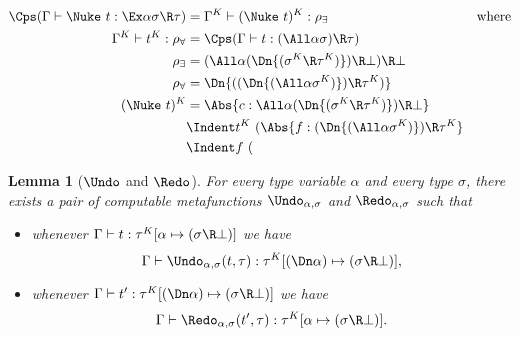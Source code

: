 \documentclass{amsart}
\newtheorem{lemma}[subsection]{Lemma}
\begin{document}
\begin{align*}
\Cps(\Gamma \vdash \Nuke~t : \Ex\alpha \sigma \R \tau)
  & =
  \Gamma^K \vdash (\Nuke~t)^K : \rho_\exists
  &\mbox{where}
  \\
\Gamma^K \vdash t^K : \rho_\forall
   & =
  \Cps(\Gamma \vdash t : (\All\alpha\sigma) \R \tau)
  \\
\rho_\exists & =
  (\All\alpha (\Dn{(\sigma^K \R \tau^K)}) \R \bot) \R \bot
  \\
\rho_\forall & =
  \Dn{((\Dn{(\All\alpha\sigma^K)}) \R \tau^K)}
  \\
(\Nuke~t)^K & =
  \Abs{c : \All\alpha (\Dn{(\sigma^K \R \tau^K)}) \R \bot}
  \\ &\Indent
  t^K~(\Abs{f : (\Dn{(\All\alpha\sigma^K)}) \R \tau^K}
  \\ &\Indent
  f~(
\end{align*}

\begin{lemma}
[$\Undo$ and $\Redo$]
\label{lem:undo-redo}
For every type variable $\alpha$ and every type $\sigma$, there
exists a pair of computable metafunctions $\Undo_{\alpha,\sigma}$
and $\Redo_{\alpha,\sigma}$ such that
\begin{itemize}
\item
whenever
$\Gamma \vdash t : \tau^K[\alpha \mapsto (\sigma\R\bot)]$
we have
\[
\Gamma \vdash \Undo_{\alpha,\sigma}(t,\tau) :
  \tau^K[(\Dn\alpha) \mapsto (\sigma\R\bot)],
\]
\item
whenever
$\Gamma \vdash t' : \tau^K[(\Dn\alpha) \mapsto (\sigma\R\bot)]$
we have
\[
\Gamma \vdash \Redo_{\alpha,\sigma}(t',\tau) :
  \tau^K[\alpha \mapsto (\sigma\R\bot)].
\]
\end{itemize}
\end{lemma}
\end{document}
